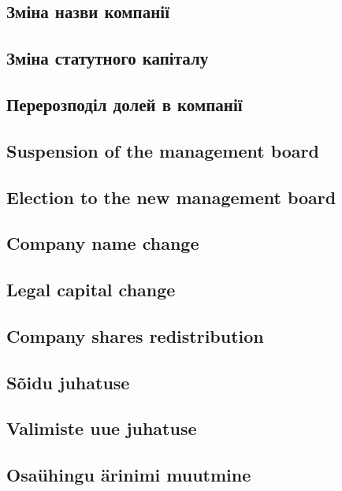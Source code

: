 \begin{Form}
\begin{paracol}{3}
{          \subsection{Зміна назви компанії}
          \subsection{Зміна статутного капіталу}
          \subsection{Перерозподіл долей в компанії}
        }
        { \subsection{Suspension of the management board}
          \subsection{Election to the new management board}
          \subsection{Company name change}
          \subsection{Legal capital change}
          \subsection{Company shares redistribution}
        }
        { \subsection{Sõidu juhatuse}
          \subsection{Valimiste uue juhatuse}
          \subsection{Osaühingu ärinimi muutmine}
}
\end{paracol}
\end{Form}
